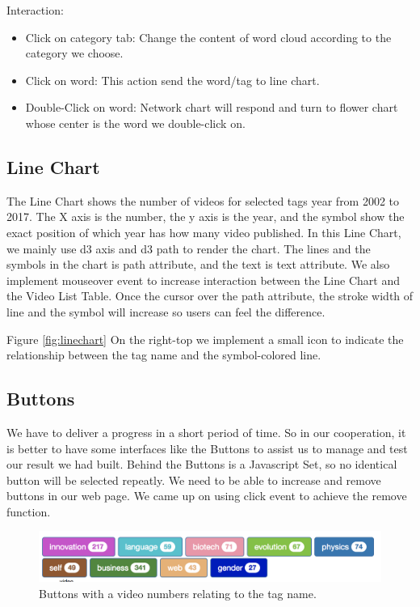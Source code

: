 \documentclass{report}
\numberwithin{figure}{section}
\begin{document}
\quad Interaction:

\begin{itemize}
\item
Click on category tab:
\newline Change the content of word cloud according to the category we choose.
\item
Click on word:
\newline This action send the word/tag to line chart.
\item
Double-Click on word:
\newline Network chart will respond and turn to flower chart whose center is the word we double-click on.

\end{itemize}

\subsection{Line Chart}

\quad The Line Chart shows the number of videos for selected tags year from 2002 to 2017. The X axis is the number, the y axis is the year, and the symbol show the exact position of which year has how many video published. In this Line Chart, we mainly use d3 axis and d3 path to render the chart. The lines and the symbols in the chart is path attribute, and the text is text attribute. We also implement mouseover event to increase interaction between the Line Chart and the Video List Table. Once the cursor over the path attribute, the stroke width of line and the symbol will increase so users can feel the difference.

Figure \ref{fig:linechart} On the right-top we implement a small icon to indicate the relationship between the tag name and the symbol-colored line.

\subsection{Buttons}

\quad We have to deliver a progress in a short period of time. So in our cooperation, it is better to have some interfaces like the Buttons to assist us to manage and test our result we had built. Behind the Buttons is a Javascript Set, so no identical button will be selected repeatly. We need to be able to increase and remove buttons in our web page. We came up on using click event to achieve the remove function.

\begin{figure}
\begin{center}
\includegraphics[scale=0.6]{buttons}
\caption{Buttons with a video numbers relating to the tag name.}
\label{fig:buttons}
\end{center}
\end{figure}
\end{document}
